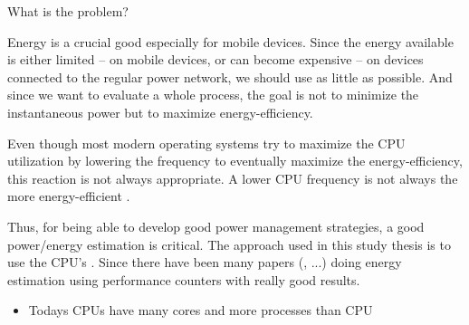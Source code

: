 
What is the problem?

Energy is a crucial good especially for mobile devices. Since the energy
available is either limited -- on mobile devices, or can become expensive --
on devices connected to the regular power network, we should use as little as
possible. And since we want to evaluate a whole process, the goal is not to
minimize the instantaneous power but to maximize energy-efficiency.

Even though most modern operating systems try to maximize the CPU utilization
by lowering the frequency \cite{snowdon2010operating} to eventually maximize the
energy-efficiency, this reaction is not always appropriate. A lower CPU
frequency is not always the more energy-efficient
\cite{weissel2002process,snowdon2010operating}.

Thus, for being able to develop good power management strategies, a good
power/energy estimation is critical. The approach used in this study thesis is
to use the CPU's .  Since
\cite{bellosa2000benefits} there have been many papers
(\cite{Bertran2010,bertran2010decomposable,kellner03tempcontrol,isci2003runtime,
weissel2002process}, ...) doing energy estimation using performance counters
with really good results.

\begin{itemize}

\item Todays CPUs have many cores and more processes than CPU

\end{itemize}

